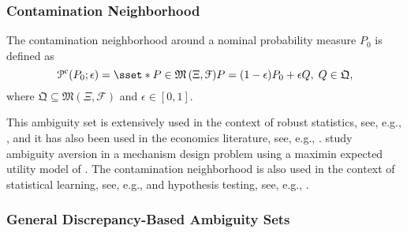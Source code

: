 \documentclass[final,onefignum,onetabnum]{class}
\newcommand{\Cs}[1]{\mathcal{#1}} %
\newcommand{\Fs}[1]{\mathfrak{#1}} %
\newcommand{\measurespace}{\left( \Xi, \Cs{F} \right)}
\begin{document}
\subsubsection{Contamination Neighborhood}
The contamination neighborhood \linebreak around a nominal probability measure $P_{0}$ is defined as 
\begin{equation}
    \label{eq: rev.contamination_set}
	\Cs{P}^{\text{c}}(P_{0};\epsilon) = \sset*{P \in \Fs{M}\measurespace} {P= (1-\epsilon) P_{0} + \epsilon Q, \; Q \in  \Fs{Q}},
\end{equation}
where $\Fs{Q} \subseteq \Fs{M}\measurespace$ and $\epsilon \in [0,1]$. 

This ambiguity set is extensively used in the context of robust statistics, see, e.g., \citet{huber1973,huber2009RobustStat},  and it has also been used in the economics literature, see, e.g., \citet{nishimura2004search,nishimura2004contamination}. 
\citet{bose2009} study ambiguity aversion in a mechanism design problem using a maximin expected utility model of \citet{gilboa1989}. %
The contamination neighborhood is also used in the context of statistical learning, see, e.g., \citet{duchi2019} and hypothesis testing, see, e.g.,  \citet{huber1965}. 





\subsubsection{General Discrepancy-Based Ambiguity Sets}
\end{document}
